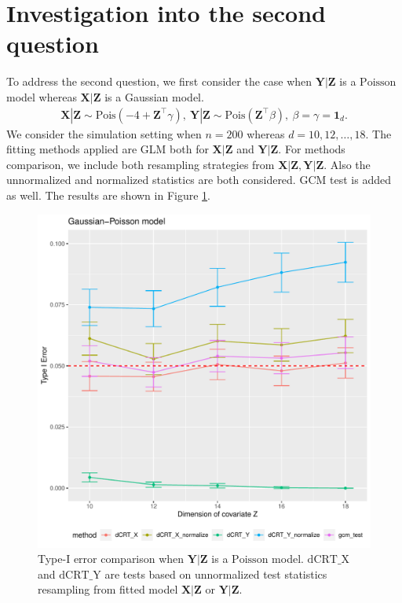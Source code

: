 \documentclass{article}
\begin{document}
\section{Investigation into the second question}

To address the second question, we first consider the case when $\bm Y|\bm Z$ is a $\mathrm{Poisson}$ model whereas 
$\bm X|\bm Z$ is a Gaussian model.
\begin{align*}
    \bm X|\bm Z\sim \mathrm{Pois}(-4+\bm Z^\top \gamma),\ \bm Y|\bm Z\sim \mathrm{Pois}(\bm Z^\top \beta),\ \beta=\gamma=\mathbf{1}_d.
\end{align*}
We consider the simulation setting when $n=200$ whereas $d=10,12,\ldots, 18$. The fitting methods 
applied are GLM both for $\bm X|\bm Z$ and $\bm Y|\bm Z$. For methods comparison, we include both resampling 
strategies from $\bm X|\bm Z,\bm Y|\bm Z$. Also the unnormalized and normalized statistics are both considered.
$\mathrm{GCM}$ test is added as well. The results are shown in Figure \ref{fig:dCRT_GCM_asymmetry}. 

\begin{figure}[!h]
    \centering
        \includegraphics[scale = 0.7]{Figures/Q2/varying-dimension-gaussian-poisson-200-10-18.pdf}
    \caption{Type-I error comparison when $\bm Y|\bm Z$ is a $\mathrm{Poisson}$ model. $\mathrm{dCRT}\_\text{X}$ and 
    $\mathrm{dCRT}\_\text{Y}$ are tests based on unnormalized test statistics resampling from fitted model $\bm X|\bm Z$ 
    or $\bm Y|\bm Z$.}
    \label{fig:dCRT_GCM_asymmetry} 
\end{figure}
\end{document}
